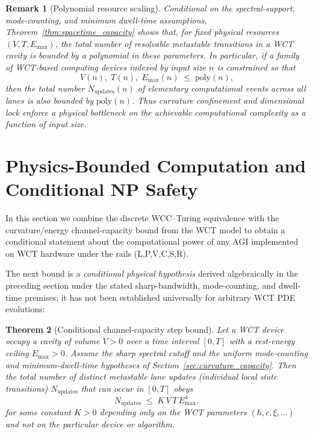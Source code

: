 \documentclass[12pt]{article}
\newtheorem{theorem}{Theorem}[section]
\newtheorem{remark}[theorem]{Remark}
\begin{document}
\begin{remark}[Polynomial resource scaling]
\label{rem:poly_resources}
Conditional on the spectral-support, mode-counting, and minimum
dwell-time assumptions, Theorem~\ref{thm:spacetime_capacity} shows that, for fixed physical resources $(V,T,E_{\max})$, the total number of resolvable metastable transitions in a WCT cavity is bounded by a polynomial in these parameters. In particular, if a family of WCT-based computing devices indexed by input size $n$ is constrained so that
\[
V(n),\; T(n),\; E_{\max}(n) \;\le\; \mathrm{poly}(n),
\]
then the total number $N_{\mathrm{updates}}(n)$ of elementary computational events across all lanes is also bounded by $\mathrm{poly}(n)$. Thus curvature confinement and dimensional lock enforce a physical bottleneck on the achievable computational complexity as a function of input size.
\end{remark}


















\section{Physics-Bounded Computation and Conditional NP Safety}
\label{sec:phys_np_safety}

In this section we combine the discrete WCC--Turing equivalence with the
curvature/energy channel-capacity bound from the WCT model to obtain a
conditional statement about the computational power of any AGI implemented
on WCT hardware under the rails (L,P,V,C,S,R).

The next bound is a \emph{conditional physical hypothesis} derived
algebraically in the preceding section under the stated sharp-bandwidth,
mode-counting, and dwell-time premises; it has not been established
universally for arbitrary WCT PDE evolutions:

\begin{theorem}[Conditional channel-capacity step bound]
\label{thm:channel_capacity}
Let a WCT device occupy a cavity of volume $V > 0$ over a time interval
$[0,T]$ with a rest-energy ceiling $E_{\max} > 0$.
Assume the sharp spectral cutoff and the uniform mode-counting and
minimum-dwell-time hypotheses of Section~\ref{sec:curvature_capacity}.
Then the total number of distinct metastable lane updates
(individual local state transitions) $N_{\mathrm{updates}}$ that can occur
in $[0,T]$ obeys
\begin{equation}
  \label{eq:Nupdates_energy_restated}
  N_{\mathrm{updates}} \;\le\; K\,V\,T\,E_{\max}^4,
\end{equation}
for some constant $K > 0$ depending only on the WCT parameters
$(\hbar,c,\xi,\dots)$ and not on the particular device or algorithm.
\end{theorem}
\end{document}
